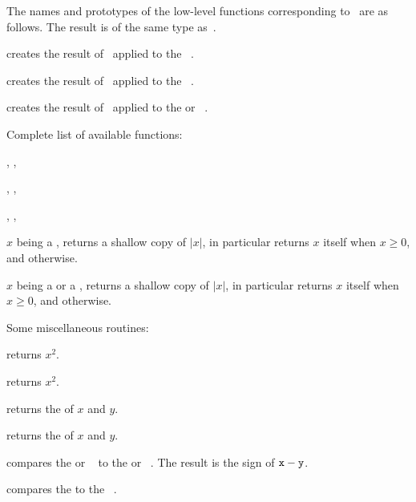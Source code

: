 \noindent The names and prototypes of the low-level functions corresponding
to \op\ are as follows. The result is of the same type as~.

 creates the result of \op\ applied to the
~.

 creates the result of \op\ applied to the
~.

 creates the result of \op\ applied to the
 or ~.

\noindent Complete list of available functions:

, , 

, , 

, , 

 $x$ being a , returns a shallow copy of
$|x|$, in particular returns $x$ itself when $x \geq 0$, and 
otherwise.

 $x$ being a  or a , returns
a shallow copy of $|x|$, in particular returns $x$ itself when $x \geq 0$, and
 otherwise.


\noindent Some miscellaneous routines:

 returns $x^2$.

 returns $x^2$.




 returns the  of $x$ and $y$.




 returns the  of $x$ and $y$.

\smallskip

 compares the  or ~
to the  or ~. The result is the sign of
${\tt x}-{\tt y}$.

 compares the   to the
~.

